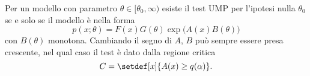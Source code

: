 \begin{fact}
	\label{th:umpge}
	Per un modello con parametro $\theta\in[\theta_0,\infty)$
	esiste il test UMP per l'ipotesi nulla $\theta_0$
	se e solo se il modello è nella forma
	\begin{equation*}
		p(x;\theta)
		= F(x) G(\theta) \exp\big(A(x) B(\theta)\big)
	\end{equation*}
	con $B(\theta)$ monotona.
	Cambiando il segno di $A$, $B$ può sempre essere presa crescente,
	nel qual caso il test è dato dalla regione critica
	\begin{equation*}
		C = \setdef[x]{A(x) \ge q(\alpha)}.
	\end{equation*}
\end{fact}



